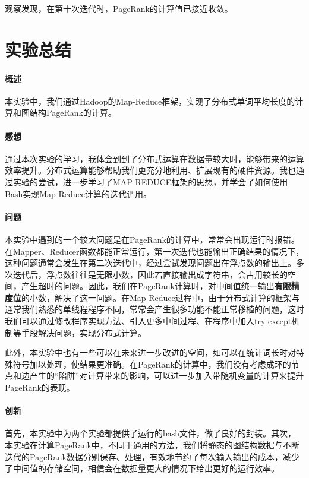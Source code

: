 \documentclass{article}
\begin{document}
观察发现，在第十次迭代时，PageRank的计算值已接近收敛。

\section{实验总结}
\paragraph{概述}
本实验中，我们通过Hadoop的Map-Reduce框架，实现了分布式单词平均长度的计算和图结构PageRank的计算。

\paragraph{感想}
通过本次实验的学习，我体会到到了分布式运算在数据量较大时，能够带来的运算效率提升。分布式运算能够帮助我们更充分地利用、扩展现有的硬件资源。我也通过实验的尝试，进一步学习了MAP-REDUCE框架的思想，并学会了如何使用Bash实现Map-Reduce计算的迭代调用。

\paragraph{问题}
本实验中遇到的一个较大问题是在PageRank的计算中，常常会出现运行时报错。在Mapper、Reducer函数都能正常运行，第一次迭代也能输出正确结果的情况下，这种问题通常会发生在第二次迭代中，经过尝试发现问题出在浮点数的输出上。多次迭代后，浮点数往往是无限小数，因此若直接输出成字符串，会占用较长的空间，产生超时的问题。因此，我们在PageRank计算时，对中间值统一输出\textbf{有限精度位}的小数，解决了这一问题。在Map-Reduce过程中，由于分布式计算的框架与通常我们熟悉的单线程程序不同，常常会产生很多功能不能正常移植的问题，这时我们可以通过修改程序实现方法、引入更多中间过程、在程序中加入try-except机制等手段解决问题，实现分布式计算。

此外，本实验中也有一些可以在未来进一步改进的空间，如可以在统计词长时对特殊符号加以处理，使结果更准确。在PageRank的计算中，我们没有考虑成环的节点和边产生的“陷阱”对计算带来的影响，可以进一步加入带随机变量的计算来提升PageRank的表现。

\paragraph{创新}

首先，本实验中为两个实验都提供了运行的bash文件，做了良好的封装。其次，本实验在计算PageRank中，不同于通用的方法，我们将静态的图结构数据与不断迭代的PageRank数据分别保存、处理，有效地节约了每次输入输出的成本，减少了中间值的存储空间，相信会在数据量更大的情况下给出更好的运行效率。
\end{document}
